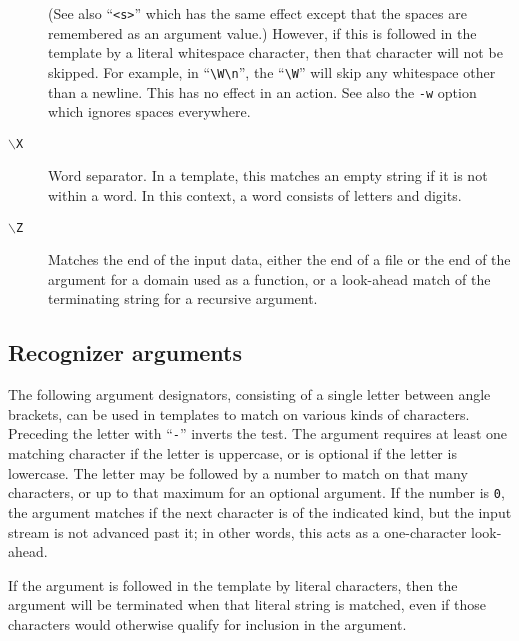 \begin{description}
(See also ``\verb/<s>/'' which has the same effect except that the
spaces are remembered as an argument value.)
However, if this is followed in the template by a literal whitespace
character, then that character will not be skipped.  For example, in
``\verb/\W\n/'', the ``\verb/\W/'' will skip any whitespace other than a
newline. 
This has no effect in an action.
See also the \verb/-w/ option which ignores spaces everywhere.
\item[{\tt $\backslash$X}]
Word separator.  In a template, this matches an empty string if it is
not within a word.  In this context, a word consists of letters and digits.
\item[{\tt $\backslash$Z}]
Matches the end of the input data, either the end of a file
or the end of the argument for a domain used as a function,
or a look-ahead match of the terminating string for a recursive argument.
\end{description}


\subsection{Recognizer arguments}
The following argument designators, consisting of a single letter between
angle brackets, can be used in templates to match on
various kinds of characters.  Preceding the letter with
``\verb|-|''
inverts the test.  The argument requires at least one matching character
if the letter is uppercase, or is optional if the letter is lowercase.
The letter may be followed by a number to match on that many
characters, or up to that maximum for an optional argument.  If the
number is {\tt 0},
the argument matches if the next character is of the
indicated kind, but the input stream is not advanced past it; in other
words, this acts as a one-character look-ahead.

If the argument is followed in the template by literal characters, then
the argument will be terminated when that literal string is matched,
even if those characters would otherwise qualify for inclusion in the
argument.

